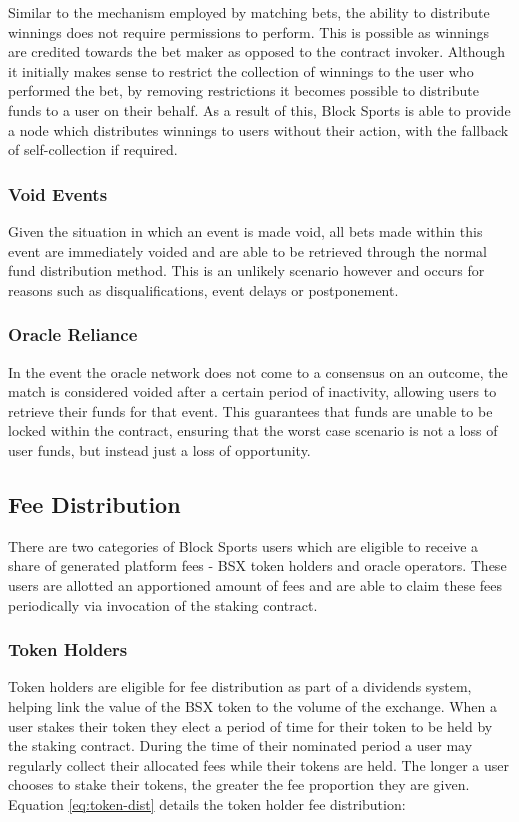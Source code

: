 \documentclass{article}
\begin{document}
Similar to the mechanism employed by matching bets, the ability to distribute winnings does not require permissions to perform. This is possible as winnings are credited towards the bet maker as opposed to the contract invoker. Although it initially makes sense to restrict the collection of winnings to the user who performed the bet, by removing restrictions it becomes possible to distribute funds to a user on their behalf. As a result of this, Block Sports is able to provide a node which distributes winnings to users without their action, with the fallback of self-collection if required.

		\subsubsection{Void Events} \label{void-events}
Given the situation in which an event is made void, all bets made within this event are immediately voided and are able to be retrieved through the normal fund distribution method. This is an unlikely scenario however and occurs for reasons such as disqualifications, event delays or postponement.

		\subsubsection{Oracle Reliance} \label{oracle-reliance}
In the event the oracle network does not come to a consensus on an outcome, the match is considered voided after a certain period of inactivity, allowing users to retrieve their funds for that event. This guarantees that funds are unable to be locked within the contract, ensuring that the worst case scenario is not a loss of user funds, but instead just a loss of opportunity.

	\subsection{Fee Distribution} \label{fee-distribution}
There are two categories of Block Sports users which are eligible to receive a share of generated platform fees - BSX token holders and oracle operators. These users are allotted an apportioned amount of fees and are able to claim these fees periodically via invocation of the staking contract.

		\subsubsection{Token Holders} \label{token-holders}
Token holders are eligible for fee distribution as part of a dividends system, helping link the value of the BSX token to the volume of the exchange. When a user stakes their token they elect a period of time for their token to be held by the staking contract. During the time of their nominated period a user may regularly collect their allocated fees while their tokens are held. The longer a user chooses to stake their tokens, the greater the fee proportion they are given. Equation \ref{eq:token-dist} details the token holder fee distribution:
\end{document}
